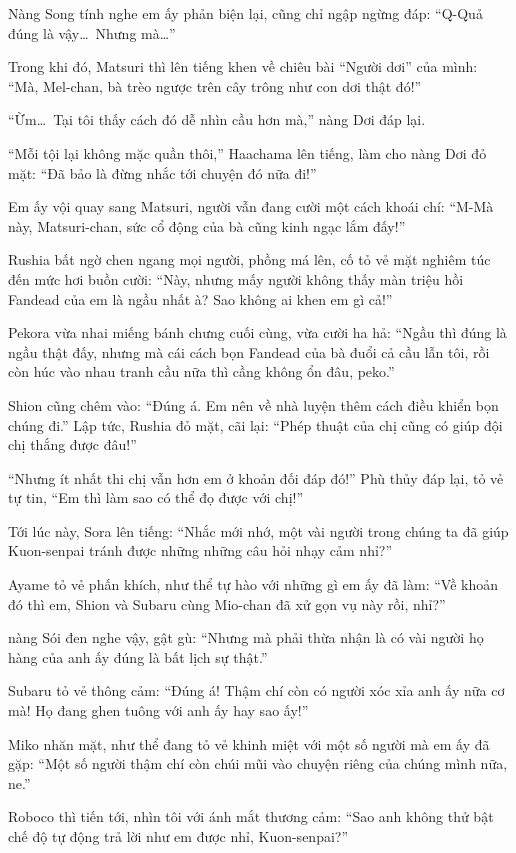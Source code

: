 \documentclass[../main.tex]{subfiles}
\begin{document}
Nàng Song tính nghe em ấy phản biện lại, cũng chỉ ngập ngừng đáp: ``Q-Quả đúng là vậy\dots\ Nhưng mà\dots''

Trong khi đó, Matsuri thì lên tiếng khen về chiêu bài ``Người dơi'' của mình: ``Mà, Mel-chan, bà trèo ngược trên cây trông như con dơi thật đó!''

``Ừm\dots\ Tại tôi thấy cách đó dễ nhìn cầu hơn mà,'' nàng Dơi đáp lại.

``Mỗi tội lại không mặc quần thôi,'' Haachama lên tiếng, làm cho nàng Dơi đỏ mặt: ``Đã bảo là đừng nhắc tới chuyện đó nữa đi!''

Em ấy vội quay sang Matsuri, người vẫn đang cười một cách khoái chí: ``M-Mà này, Matsuri-chan, sức cổ động của bà cũng kinh ngạc lắm đấy!''

Rushia bất ngờ chen ngang mọi người, phồng má lên, cố tỏ vẻ mặt nghiêm túc đến mức hơi buồn cười: ``Này, nhưng mấy người không thấy màn triệu hồi Fandead của em là ngầu nhất à? Sao không ai khen em gì cả!''

Pekora vừa nhai miếng bánh chưng cuối cùng, vừa cười ha hả: ``Ngầu thì đúng là ngầu thật đấy, nhưng mà cái cách bọn Fandead của bà đuổi cả cầu lẫn tôi, rồi còn húc vào nhau tranh cầu nữa thì cầng không ổn đâu, peko.''

Shion cũng chêm vào: ``Đúng á. Em nên về nhà luyện thêm cách điều khiển bọn chúng đi.'' Lập tức, Rushia đỏ mặt, cãi lại: ``Phép thuật của chị cũng có giúp đội chị thắng được đâu!''

``Nhưng ít nhất thi chị vẫn hơn em ở khoản đối đáp đó!'' Phù thủy đáp lại, tỏ vẻ tự tin, ``Em thì làm sao có thể đọ được với chị!''

Tới lúc này, Sora lên tiếng: ``Nhắc mới nhớ, một vài người trong chúng ta đã giúp Kuon-senpai tránh được những những câu hỏi nhạy cảm nhỉ?''

Ayame tỏ vẻ phấn khích, như thể tự hào với những gì em ấy đã làm: ``Về khoản đó thì em, Shion và Subaru cùng Mio-chan đã xử gọn vụ này rồi, nhỉ?''

nàng Sói đen nghe vậy, gật gù: ``Nhưng mà phải thừa nhận là có vài người họ hàng của anh ấy đúng là bất lịch sự thật.''

Subaru tỏ vẻ thông cảm: ``Đúng á! Thậm chí còn có người xóc xỉa anh ấy nữa cơ mà! Họ đang ghen tuông với anh ấy hay sao ấy!''

Miko nhăn mặt, như thể đang tỏ vẻ khinh miệt với một số người mà em ấy đã gặp: ``Một số người thậm chí còn chúi mũi vào chuyện riêng của chúng mình nữa, ne.''

Roboco thì tiến tới, nhìn tôi với ánh mắt thương cảm: ``Sao anh không thử bật chế độ tự động trả lời như em được nhỉ, Kuon-senpai?''
\end{document}
